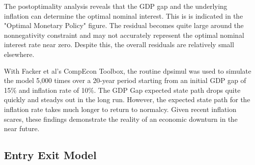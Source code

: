 \documentclass[a4paper,oneside]{article}
\begin{document}
The postoptimality analysis reveals that the GDP gap and the underlying inflation can determine the optimal nominal interest. 
This is is indicated in the "Optimal Monetary Policy" figure. 
The residual becomes quite large around the nonnegativity constraint and may not accurately represent the optimal nominal interest rate near zero.
Despite this, the overall residuals are relatively small elsewhere.

With Facker et al's CompEcon Toolbox, the routine dpsimul was used to simulate the model 5,000 times over a 20-year period starting from an initial GDP gap of 15\% and inflation rate of 10\%.
The GDP Gap expected state path drops quite quickly and steadys out in the long run. 
However, the expected state path for the inflation rate takes much longer to return to normalcy.
Given recent inflation scares, these findings demonstrate the reality of an economic downturn in the near future.

\subsection{Entry Exit Model}
\end{document}
